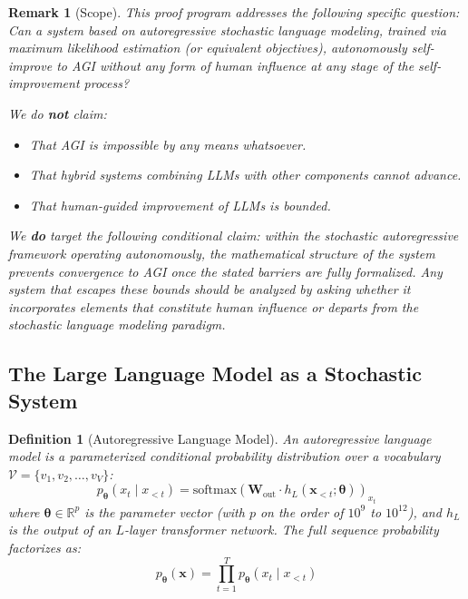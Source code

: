 \documentclass[11pt,a4paper]{article}
\newtheorem{definition}[theorem]{Definition}
\newtheorem{remark}[theorem]{Remark}
\begin{document}
\begin{remark}[Scope]
This proof program addresses the following specific question: \emph{Can a system based on autoregressive stochastic language modeling, trained via maximum likelihood estimation (or equivalent objectives), autonomously self-improve to AGI without any form of human influence at any stage of the self-improvement process?}

We do \textbf{not} claim:
\begin{itemize}
    \item That AGI is impossible by any means whatsoever.
    \item That hybrid systems combining LLMs with other components cannot advance.
    \item That human-guided improvement of LLMs is bounded.
\end{itemize}

We \textbf{do} target the following conditional claim: within the stochastic autoregressive framework operating autonomously, the mathematical structure of the system prevents convergence to AGI once the stated barriers are fully formalized. Any system that escapes these bounds should be analyzed by asking whether it incorporates elements that constitute human influence or departs from the stochastic language modeling paradigm.
\end{remark}

\subsection{The Large Language Model as a Stochastic System}

\begin{definition}[Autoregressive Language Model]
An autoregressive language model is a parameterized conditional probability distribution over a vocabulary $\mathcal{V} = \{v_1, v_2, \ldots, v_V\}$:
\begin{equation}
p_{\bm{\theta}}(x_t \mid x_{<t}) = \mathrm{softmax}\!\left(\bm{W}_{\mathrm{out}} \cdot h_L(\bm{x}_{<t}; \bm{\theta})\right)_{x_t}
\end{equation}
where $\bm{\theta} \in \mathbb{R}^p$ is the parameter vector (with $p$ on the order of $10^{9}$ to $10^{12}$), and $h_L$ is the output of an $L$-layer transformer network. The full sequence probability factorizes as:
\begin{equation}
p_{\bm{\theta}}(\bm{x}) = \prod_{t=1}^{T} p_{\bm{\theta}}(x_t \mid x_{<t})
\end{equation}
\end{definition}
\end{document}
